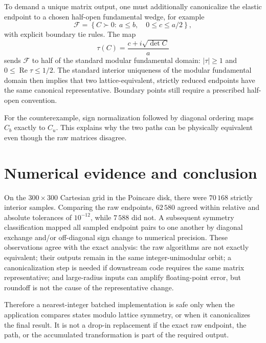 \documentclass[11pt]{article}
\begin{document}
To demand a unique matrix output, one must additionally canonicalize the
elastic endpoint to a chosen half-open fundamental wedge, for example
\[
 \mathcal{F}
 =\left\{C\succ0:\ a\leq b,\quad 0\leq c\leq a/2\right\},
\]
with explicit boundary tie rules.  The map
\[
 \tau(C)=\frac{c+i\sqrt{\det C}}{a}
\]
sends $\mathcal{F}$ to half of the standard modular fundamental domain:
$|\tau|\geq1$ and $0\leq\operatorname{Re}\tau\leq1/2$.
The standard interior uniqueness of the modular fundamental domain then implies
that two lattice-equivalent, strictly reduced endpoints have the same
canonical representative.  Boundary points still require a prescribed
half-open convention.

For the counterexample, sign normalization followed by diagonal ordering maps
$C_b$ exactly to $C_u$.  This explains why the two paths can be physically
equivalent even though the raw matrices disagree.

\section{Numerical evidence and conclusion}

On the $300\times300$ Cartesian grid in the Poincare disk, there were $70\,168$
strictly interior samples.  Comparing the raw endpoints,
$62\,580$ agreed within relative and absolute tolerances of $10^{-12}$, while
$7\,588$ did not.  A subsequent symmetry classification mapped all sampled
endpoint pairs to one another by diagonal exchange and/or off-diagonal sign
change to numerical precision.  These observations agree with the exact
analysis: the raw algorithms are not exactly equivalent; their outputs remain
in the same integer-unimodular orbit; a canonicalization step is needed if
downstream code requires the same matrix representative; and large-radius
inputs can amplify floating-point error, but roundoff is not the cause of the
representative change.

Therefore a nearest-integer batched implementation is safe only when the
application compares states modulo lattice symmetry, or when it canonicalizes
the final result.  It is not a drop-in replacement if the exact raw endpoint,
the path, or the accumulated transformation is part of the required output.
\end{document}
